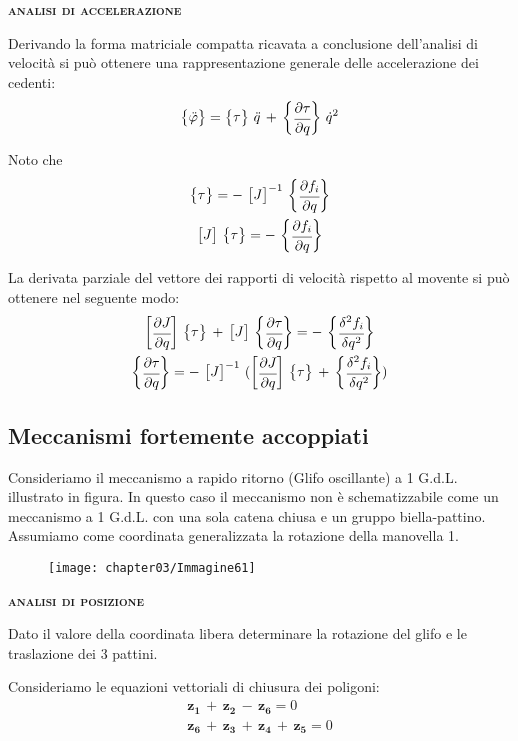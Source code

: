 		
		\begin{center}
			{\scshape{\bfseries analisi di accelerazione}}
		\end{center}
		
		Derivando la forma matriciale compatta ricavata a conclusione dell'analisi di velocità si può ottenere una rappresentazione generale delle accelerazione dei cedenti:
		\[
		\begin{Bmatrix}\ddot{\varphi}\end{Bmatrix} = \begin{Bmatrix}\tau\end{Bmatrix}\,\ddot{q}\,+\,\begin{Bmatrix}\cfrac{\partial\tau}{\partial q}\end{Bmatrix}\,\dot{q}^2
		\]
		
		Noto che
		\begin{gather*}
		\begin{Bmatrix}\tau\end{Bmatrix} = -\,\begin{bmatrix}J\end{bmatrix}^{-1}\,\begin{Bmatrix}\cfrac{\partial f_i}{\partial q}\end{Bmatrix}\\
		\begin{bmatrix}J\end{bmatrix}\,\begin{Bmatrix}\tau\end{Bmatrix} = -\,\begin{Bmatrix}\cfrac{\partial f_i}{\partial q}\end{Bmatrix}
		\end{gather*}
		
		La derivata parziale del vettore dei rapporti di velocità rispetto al movente si può ottenere nel seguente modo:
		\begin{gather*}
		\begin{bmatrix}\cfrac{\partial J}{\partial q}\end{bmatrix}\,\begin{Bmatrix}\tau\end{Bmatrix}\,+\,\begin{bmatrix}J\end{bmatrix}\,\begin{Bmatrix}\cfrac{\partial\tau}{\partial q}\end{Bmatrix} = -\,\begin{Bmatrix}\cfrac{\delta^2f_i}{\delta q^2}\end{Bmatrix}\\
		\begin{Bmatrix}\cfrac{\partial\tau}{\partial q}\end{Bmatrix} = -\,\begin{bmatrix}J\end{bmatrix}^{-1}\,(\begin{bmatrix}\cfrac{\partial J}{\partial q}\end{bmatrix}\,\begin{Bmatrix}\tau\end{Bmatrix}\,+\,\begin{Bmatrix}\cfrac{\delta^2f_i}{\delta q^2}\end{Bmatrix})
		\end{gather*}
		
		\subsection{Meccanismi fortemente accoppiati}
		
		Consideriamo il meccanismo a rapido ritorno (Glifo oscillante) a 1 G.d.L. illustrato in figura. In questo caso il meccanismo non è schematizzabile come un meccanismo a 1 G.d.L. con una sola catena chiusa e un gruppo biella-pattino. Assumiamo come coordinata generalizzata la rotazione della manovella 1.
		
			
		\begin{figure}[!h]
		\centering
		\texttt{[image: chapter03/Immagine61]}
		\end{figure}		
		
		\begin{center}
		{\scshape{\bfseries analisi di posizione}}
		\end{center}
		
		Dato il valore della coordinata libera determinare la rotazione del glifo e le traslazione dei 3 pattini.
		
		Consideriamo le equazioni vettoriali di chiusura dei poligoni:
		\begin{gather*}
		\mathbf{z_1}\,+\,\mathbf{z_2}\,-\,\mathbf{z_6}=0\\
		\mathbf{z_6}\,+\,\mathbf{z_3}\,+\,\mathbf{z_4}\,+\,\mathbf{z_5}=0		
		\end{gather*}
	

